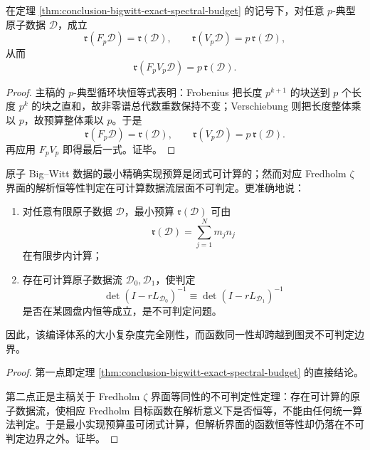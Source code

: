 \begin{corollary}\label{cor:conclusion-bigwitt-typical-fv-budget-law}
在定理 \ref{thm:conclusion-bigwitt-exact-spectral-budget} 的记号下，对任意 \(p\)-典型原子数据 \(\mathcal D\)，成立
\[
\mathfrak r(F_p\mathcal D)=\mathfrak r(\mathcal D),
\qquad
\mathfrak r(V_p\mathcal D)=p\,\mathfrak r(\mathcal D),
\]
从而
\[
\mathfrak r(F_pV_p\mathcal D)=p\,\mathfrak r(\mathcal D).
\]
\end{corollary}
\begin{proof}
主稿的 \(p\)-典型循环块恒等式表明：Frobenius 把长度 \(p^{k+1}\) 的块送到 \(p\) 个长度 \(p^k\) 的块之直和，故非零谱总代数重数保持不变；Verschiebung 则把长度整体乘以 \(p\)，故预算整体乘以 \(p\)。于是
\[
\mathfrak r(F_p\mathcal D)=\mathfrak r(\mathcal D),
\qquad
\mathfrak r(V_p\mathcal D)=p\,\mathfrak r(\mathcal D).
\]
再应用 \(F_pV_p\) 即得最后一式。证毕。
\end{proof}

\begin{theorem}[预算可判定而函数恒等不可判定的二分律]\label{thm:conclusion-bigwitt-budget-decidable-identity-undecidable}
原子 Big--Witt 数据的最小精确实现预算是闭式可计算的；然而对应 Fredholm \(\zeta\) 界面的解析恒等性判定在可计算数据流层面不可判定。更准确地说：
\begin{enumerate}
  \item 对任意有限原子数据 \(\mathcal D\)，最小预算 \(\mathfrak r(\mathcal D)\) 可由
  \[
  \mathfrak r(\mathcal D)=\sum_{j=1}^{N}m_jn_j
  \]
  在有限步内计算；
  \item 存在可计算原子数据流 \(\mathcal D_0,\mathcal D_1\)，使判定
  \[
  \det(I-rL_{\mathcal D_0})^{-1}\equiv \det(I-rL_{\mathcal D_1})^{-1}
  \]
  是否在某圆盘内恒等成立，是不可判定问题。
\end{enumerate}
因此，该编译体系的大小复杂度完全刚性，而函数同一性却跨越到图灵不可判定边界。
\end{theorem}
\begin{proof}
第一点即定理 \ref{thm:conclusion-bigwitt-exact-spectral-budget} 的直接结论。

第二点正是主稿关于 Fredholm \(\zeta\) 界面等同性的不可判定性定理：存在可计算的原子数据流，使相应 Fredholm 目标函数在解析意义下是否恒等，不能由任何统一算法判定。于是最小实现预算虽可闭式计算，但解析界面的函数恒等性却仍落在不可判定边界之外。证毕。
\end{proof}

